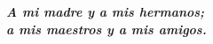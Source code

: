 \vspace*{1.5in}
\begin{flushright}
		\begin{minipage}[b]{5in}
				\Large\bfseries\emph{A mi madre y a mis hermanos; \\ a mis maestros y  a mis amigos.}
		\end{minipage}
\end{flushright}

